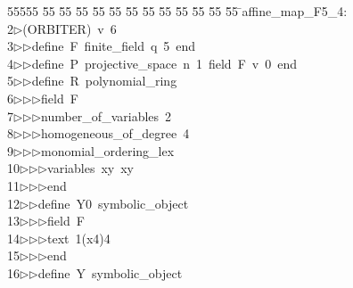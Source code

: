 %
%
\begin{tabbing}
55555 \= 55 \= 55 \= 55 \= 55 \= 55 \= 55 \= 55 \= 55 \= 55 \= 55 \= 55 \= 55 \= \>affine\_map\_F5\_4:\\[0pt]
2\>$\triangleright$\>(ORBITER)\ v\ 6\ \\[0pt]
3\>$\triangleright$\>$\triangleright$\>define\ F\ finite\_field\ q\ 5\ end\ \\[0pt]
4\>$\triangleright$\>$\triangleright$\>define\ P\ projective\_space\ n\ 1\ field\ F\ v\ 0\ end\ \\[0pt]
5\>$\triangleright$\>$\triangleright$\>define\ R\ polynomial\_ring\ \\[0pt]
6\>$\triangleright$\>$\triangleright$\>$\triangleright$\>field\ F\ \\[0pt]
7\>$\triangleright$\>$\triangleright$\>$\triangleright$\>number\_of\_variables\ 2\ \\[0pt]
8\>$\triangleright$\>$\triangleright$\>$\triangleright$\>homogeneous\_of\_degree\ 4\ \\[0pt]
9\>$\triangleright$\>$\triangleright$\>$\triangleright$\>monomial\_ordering\_lex\ \\[0pt]
10\>$\triangleright$\>$\triangleright$\>$\triangleright$\>variables\ xy\ xy\ \\[0pt]
11\>$\triangleright$\>$\triangleright$\>$\triangleright$\>end\ \\[0pt]
12\>$\triangleright$\>$\triangleright$\>define\ Y0\ symbolic\_object\ \\[0pt]
13\>$\triangleright$\>$\triangleright$\>$\triangleright$\>field\ F\ \\[0pt]
14\>$\triangleright$\>$\triangleright$\>$\triangleright$\>text\ 1(x4)4\ \\[0pt]
15\>$\triangleright$\>$\triangleright$\>$\triangleright$\>end\ \\[0pt]
16\>$\triangleright$\>$\triangleright$\>define\ Y\ symbolic\_object\ \\[0pt]

\end{tabbing}
